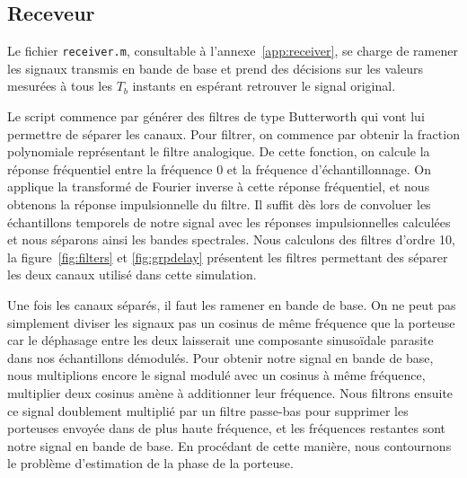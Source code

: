 \documentclass[10pt, oneside, a4paper]{article}
\begin{document}
\subsection{Receveur}
Le fichier \texttt{receiver.m}, consultable à l'annexe~\ref{app:receiver}, se charge de ramener les signaux transmis en bande de base et prend des décisions sur les valeurs mesurées à tous les $T_b$ instants en espérant retrouver le signal original.

Le script commence par générer des filtres de type Butterworth qui vont lui permettre de séparer les canaux.
Pour filtrer, on commence par obtenir la fraction polynomiale représentant le filtre analogique.
De cette fonction, on calcule la réponse fréquentiel entre la fréquence 0 et la fréquence d'échantillonnage.
On applique la transformé de Fourier inverse à cette réponse fréquentiel, et nous obtenons la réponse impulsionnelle du filtre.
Il suffit dès lors de convoluer les échantillons temporels de notre signal avec les réponses impulsionnelles calculées et nous séparons ainsi les bandes spectrales.
Nous calculons des filtres d'ordre 10, la figure~\ref{fig:filters} et \ref{fig:grpdelay} présentent les filtres permettant des séparer les deux canaux utilisé dans cette simulation.

Une fois les canaux séparés, il faut les ramener en bande de base.
On ne peut pas simplement diviser les signaux pas un cosinus de même fréquence que la porteuse car le déphasage entre les deux laisserait une composante sinusoïdale parasite dans nos échantillons démodulés.
Pour obtenir notre signal en bande de base, nous multiplions encore le signal modulé avec un cosinus à même fréquence, multiplier deux cosinus amène à additionner leur fréquence.
Nous filtrons ensuite ce signal doublement multiplié par un filtre passe-bas pour supprimer les porteuses envoyée dans de plus haute fréquence, et les fréquences restantes sont notre signal en bande de base.
En procédant de cette manière, nous contournons le problème d'estimation de la phase de la porteuse.
\end{document}
